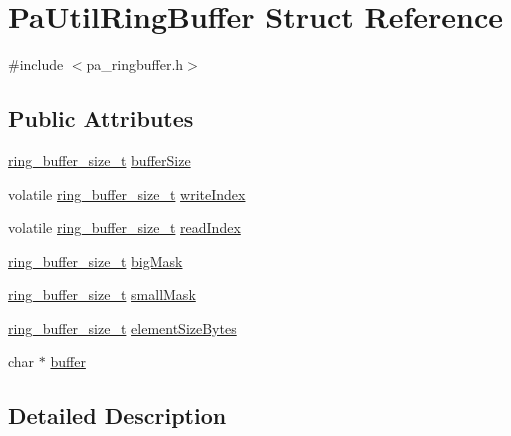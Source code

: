 \hypertarget{struct_pa_util_ring_buffer}{}\section{Pa\+Util\+Ring\+Buffer Struct Reference}
\label{struct_pa_util_ring_buffer}


{\ttfamily \#include $<$pa\+\_\+ringbuffer.\+h$>$}

\subsection*{Public Attributes}
\begin{DoxyCompactItemize}
\item 
\hyperlink{pa__ringbuffer_8h_a56482b88e581ba588fe43b1568978b94}{ring\+\_\+buffer\+\_\+size\+\_\+t} \hyperlink{struct_pa_util_ring_buffer_ae4e41eb1cc214406adb26203d4643371}{buffer\+Size}
\item 
volatile \hyperlink{pa__ringbuffer_8h_a56482b88e581ba588fe43b1568978b94}{ring\+\_\+buffer\+\_\+size\+\_\+t} \hyperlink{struct_pa_util_ring_buffer_ad2ae4e486eca6d273eed2e06f1d57aec}{write\+Index}
\item 
volatile \hyperlink{pa__ringbuffer_8h_a56482b88e581ba588fe43b1568978b94}{ring\+\_\+buffer\+\_\+size\+\_\+t} \hyperlink{struct_pa_util_ring_buffer_aae25b99beddc44ae0efe8ae2ef341401}{read\+Index}
\item 
\hyperlink{pa__ringbuffer_8h_a56482b88e581ba588fe43b1568978b94}{ring\+\_\+buffer\+\_\+size\+\_\+t} \hyperlink{struct_pa_util_ring_buffer_a15f2f074f86d67747ac3d7cddd722d3e}{big\+Mask}
\item 
\hyperlink{pa__ringbuffer_8h_a56482b88e581ba588fe43b1568978b94}{ring\+\_\+buffer\+\_\+size\+\_\+t} \hyperlink{struct_pa_util_ring_buffer_a852c77d20c925439882cdb4dc9d1c0c9}{small\+Mask}
\item 
\hyperlink{pa__ringbuffer_8h_a56482b88e581ba588fe43b1568978b94}{ring\+\_\+buffer\+\_\+size\+\_\+t} \hyperlink{struct_pa_util_ring_buffer_a5a7585b4f9929cb74e2fcf6d0e0be072}{element\+Size\+Bytes}
\item 
char $\ast$ \hyperlink{struct_pa_util_ring_buffer_ac16a18dca2fc3becee50d159cf2074f2}{buffer}
\end{DoxyCompactItemize}


\subsection{Detailed Description}


